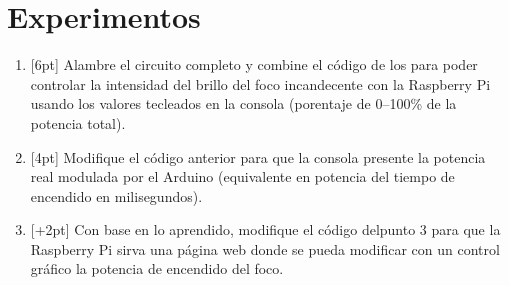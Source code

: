 %
%


\section{Experimentos}%
\label{sec:experiments}

\begin{enumerate}
	\item{} [6pt] Alambre el circuito completo y combine el código de los  para poder controlar la intensidad del brillo del foco incandecente con la Raspberry Pi usando los valores tecleados en la consola (porentaje de 0--100\% de la potencia total).

	\item{} [4pt] Modifique el código anterior para que la consola presente la potencia real modulada por el Arduino (equivalente en potencia del tiempo de encendido en milisegundos).


	\item{} [+2pt] Con base en lo aprendido, modifique el código delpunto 3 para que la Raspberry Pi sirva una página web donde se pueda modificar con un control gráfico la potencia de encendido del foco.
\end{enumerate}
